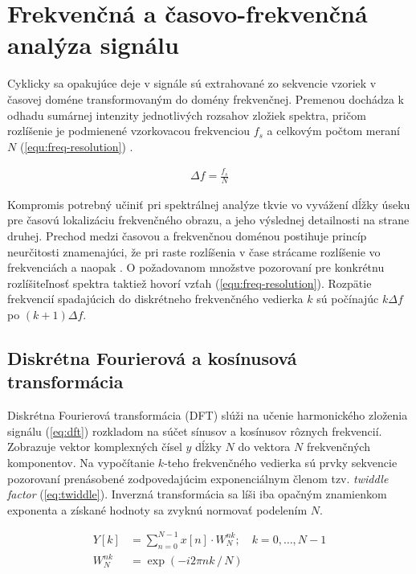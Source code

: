 \section{Frekvenčná a časovo-frekvenčná analýza signálu}
Cyklicky sa opakujúce deje v signále sú extrahované zo sekvencie vzoriek v časovej doméne transformovaným do domény frekvenčnej.
Premenou dochádza k odhadu sumárnej intenzity jednotlivých rozsahov zložiek spektra, pričom rozlíšenie je
podmienené vzorkovacou frekvenciou $f_s$ a celkovým počtom meraní $N$ (\ref{equ:freq-resolution}) \cite{understanding-dsp}.
\begin{ceqn}\begin{align}
\Delta f = \frac{f_s}{N} \label{equ:freq-resolution}
\end{align}\end{ceqn}

Kompromis potrebný učiniť pri spektrálnej analýze tkvie vo vyvážení dĺžky úseku pre časovú lokalizáciu frekvenčného obrazu,
a jeho výslednej detailnosti na strane druhej. Prechod medzi časovou a frekvenčnou doménou postihuje princíp neurčitosti
znamenajúci, že pri raste rozlíšenia v čase strácame rozlíšenie vo frekvenciách a naopak \cite{signal-processing}.
O požadovanom množstve pozorovaní pre konkrétnu rozlíšiteľnosť spektra taktiež hovorí vzťah (\ref{equ:freq-resolution}).
Rozpätie frekvencií spadajúcich do diskrétneho frekvenčného vedierka $k$ sú počínajúc $k\Delta f$ po $(k+1)\Delta f$.

\subsection{Diskrétna Fourierová a kosínusová transformácia}
Diskrétna Fourierová transformácia (DFT) slúži na učenie harmonického zloženia signálu (\ref{eq:dft}) rozkladom na súčet
sínusov a kosínusov rôznych frekvencií. Zobrazuje vektor komplexných čísel $y$ dĺžky $N$ do vektora $N$ frekvenčných
komponentov. Na vypočítanie $k$-teho frekvenčného vedierka sú
prvky sekvencie pozorovaní prenásobené zodpovedajúcim exponenciálnym členom tzv. \emph{twiddle factor} (\ref{eq:twiddle}). Inverzná
transformácia sa líši iba opačným znamienkom exponenta a získané hodnoty sa zvyknú normovať podelením $N$.
\begin{ceqn}\begin{align}
Y[k] &= \sum_{n=0}^{N - 1}{x[n] \cdot W_N^{nk}};\quad k = 0, \dots, N - 1 \label{eq:dft}\\
W_{N}^{nk} &= \exp{\left(-i2\pi nk \, /\, N\right)} \label{eq:twiddle}
\end{align}\end{ceqn}

